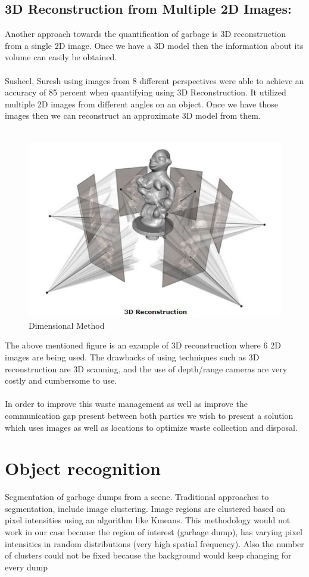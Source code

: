 \subsection{3D Reconstruction from Multiple 2D Images:}
Another approach towards the quantification of garbage is 3D reconstruction from a single 2D image. Once we have a 3D model then the information about its volume can easily be obtained.\\
\\
Susheel, Suresh \cite{suresh} using images from 8 different perspectives were able to achieve an accuracy of 85 percent when quantifying using 3D Reconstruction. It utilized multiple 2D images from different angles on an object. Once we have those images then we can reconstruct an approximate 3D model from them.\\
\\
\begin{figure}[!hb]
   \centering
   \includegraphics[scale=0.8]{images/q4.png}
   \caption{Dimensional Method}\label{fig:picture}
\end{figure}

The above mentioned figure is an example of 3D reconstruction where 6 2D images are being used.
The drawbacks of using techniques such as  3D reconstruction are 3D scanning, and the use of depth/range cameras are very costly and cumbersome to use.\\
\\
In order to improve this waste management as well as improve the communication gap present between both parties we wish to present a solution which uses images as well as locations to optimize waste collection and disposal.
\section{Object recognition}
Segmentation of garbage dumps from a scene.
Traditional approaches to segmentation, include image clustering. Image regions are clustered based on pixel intensities using an algorithm like Kmeans. This methodology would not work in our case because the region of interest (garbage dump), has varying pixel intensities in random distributions (very high spatial frequency). Also the number of clusters could not be fixed because the background would keep changing for every dump \cite{naik}\\
